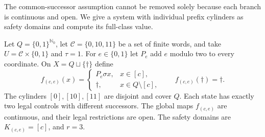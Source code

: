 \documentclass[11pt,reqno]{amsart}
\numberwithin{equation}{section}
\theoremstyle{definition}
\newcommand{\Nzero}{\mathbb N_0}
\begin{document}
The common-successor assumption cannot be removed solely because each
branch is continuous and open. We give a system with individual
prefix cylinders as safety domains and compute its full-class value.

Let $Q=\{0,1\}^{\Nzero}$, let $\mathcal C=\{0,10,11\}$ be a set of
finite words, and take $U=\mathcal C\times\{0,1\}$ and $\tau=1$.
For $e\in\{0,1\}$ let $P_e$ add $e$ modulo two to every coordinate.
On $X=Q\sqcup\{\dagger\}$ define
\begin{equation}\label{cc-eq:boundarysystem}
 f_{(c,e)}(x)=
 \begin{cases}P_e\sigma x,&x\in[c],\\
 \dagger,&x\in Q\setminus[c],\end{cases}
 \qquad f_{(c,e)}(\dagger)=\dagger.
\end{equation}
The cylinders $[0],[10],[11]$ are disjoint and cover $Q$. Each state
has exactly two legal controls with different successors. The global
maps $f_{(c,e)}$ are continuous, and their legal restrictions are open.
The safety domains are $K_{(c,e)}=[c]$, and $r=3$.
\end{document}
